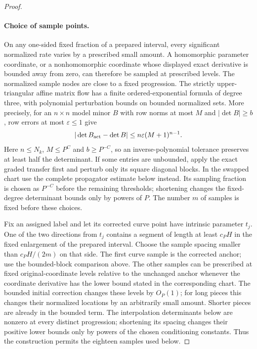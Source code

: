 \documentclass[11pt]{amsart}
\theoremstyle{definition}
\theoremstyle{remark}
\numberwithin{equation}{section}
\begin{document}
\begin{proof}
\paragraph{Choice of sample points.}

On any one-sided fixed fraction of a prepared interval, every significant normalized rate varies by a prescribed small amount. A homomorphic parameter coordinate, or a nonhomomorphic coordinate whose displayed exact derivative is bounded away from zero, can therefore be sampled at prescribed levels. The normalized sample nodes are close to a fixed progression. The strictly upper-triangular affine matrix flow has a finite ordered-exponential formula of degree three, with polynomial perturbation bounds on bounded normalized sets. More precisely, for an $n\times n$ model minor $B$ with row norms at most $M$ and $|\det B|\ge b$, row errors at most $\varepsilon\le1$ give
\[
 |\det B_{\rm act}-\det B|\le n\varepsilon(M+1)^{n-1}.
\]
Here $n\le N_k$, $M\le P^C$ and $b\ge P^{-C}$, so an inverse-polynomial tolerance preserves at least half the determinant. If some entries are unbounded, apply the exact graded transfer first and perturb only its square diagonal blocks. In the swapped chart use the complete propagator estimate below instead. Its sampling fraction is chosen as $P^{-C}$ before the remaining thresholds; shortening changes the fixed-degree determinant bounds only by powers of $P$. The number $m$ of samples is fixed before these choices.

Fix an assigned label and let its corrected curve point have intrinsic parameter $t_j$. One of the two directions from $t_j$ contains a segment of length at least $c_PH$ in the fixed enlargement of the prepared interval. Choose the sample spacing smaller than $c_PH/(2m)$ on that side. The first curve sample is the corrected anchor; use the bounded-block comparison above. The other samples can be prescribed at fixed original-coordinate levels relative to the unchanged anchor whenever the coordinate derivative has the lower bound stated in the corresponding chart. The bounded initial correction changes these levels by $O_P(1)$; for long pieces this changes their normalized locations by an arbitrarily small amount. Shorter pieces are already in the bounded term. The interpolation determinants below are nonzero at every distinct progression; shortening its spacing changes their positive lower bounds only by powers of the chosen conditioning constants. Thus the construction permits the eighteen samples used below.

\end{proof}
\end{document}
